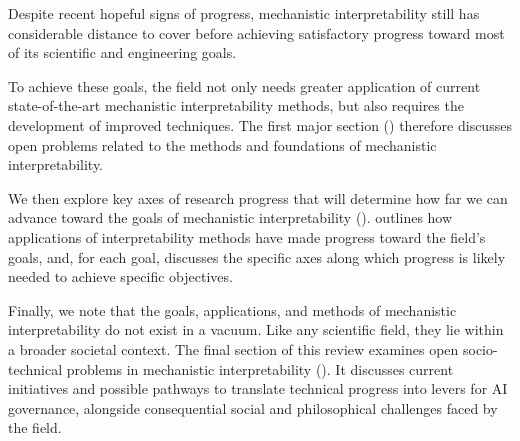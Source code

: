 Despite recent hopeful signs of progress, mechanistic interpretability still has considerable distance to cover before achieving satisfactory progress toward most of its scientific and engineering goals.

To achieve these goals, the field not only needs greater application of current state-of-the-art mechanistic interpretability methods, but also requires the development of improved techniques. The first major section () therefore discusses open problems related to the methods and foundations of mechanistic interpretability.

We then explore key axes of research progress that will determine how far we can advance toward the goals of mechanistic interpretability ().  outlines how applications of interpretability methods have made progress toward the field's goals, and, for each goal, discusses the specific axes along which progress is likely needed to achieve specific objectives.

Finally, we note that the goals, applications, and methods of mechanistic interpretability do not exist in a vacuum. Like any scientific field, they lie within a broader societal context. The final section of this review examines open socio-technical problems in mechanistic interpretability (). It discusses current initiatives and possible pathways to translate technical progress into levers for AI governance, alongside consequential social and philosophical challenges faced by the field.
